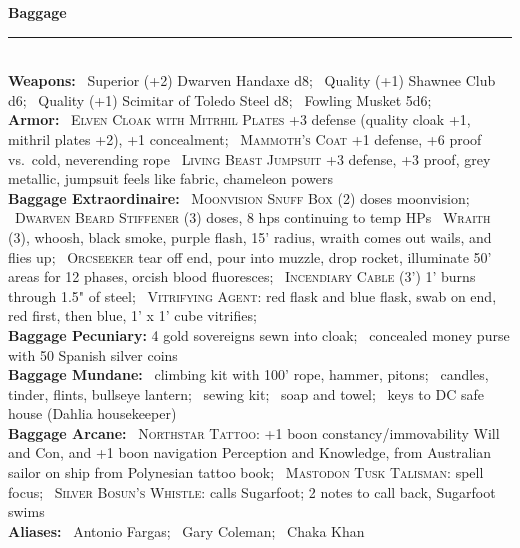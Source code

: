 \documentclass[11pt]{article}
\newcommand{\heading}[1]{{\sc\bfseries #1}}
\begin{document}
\clearpage
\noindent
{\sc\bfseries\Large Baggage}
\vspace*{4pt}
\hrule
\mbox{ }
\\[4pt]
\heading{Weapons:}
\ Superior (+2) Dwarven Handaxe d8;
\ Quality (+1) Shawnee Club d6;
\ Quality (+1) Scimitar of Toledo Steel d8;
\ Fowling Musket 5d6;
%
\\[6pt]
%
\heading{Armor:}
\ \textsc{Elven Cloak with Mitrhil Plates} +3 defense (quality cloak
+1, mithril plates +2), +1 concealment;
\ \textsc{Mammoth's Coat} +1 defense, +6 proof vs.\ cold, neverending rope
\ \textsc{Living Beast Jumpsuit} +3 defense, +3 proof, grey metallic,
jumpsuit feels like fabric, chameleon powers
%
\\[6pt]
%
\heading{Baggage Extraordinaire:}
\ \textsc{Moonvision Snuff Box} (2) doses moonvision;
\ \textsc{Dwarven Beard Stiffener} (3) doses, 8 hps continuing to temp
HPs
\ \textsc{Wraith} (3), whoosh, black smoke, purple flash, 15' radius,
wraith comes out wails, and flies up;
\ \textsc{Orcseeker} tear off end, pour into muzzle, drop rocket,
illuminate 50' areas for 12 phases, orcish blood fluoresces;
\ \textsc{Incendiary Cable} (3') 1' burns through 1.5" of steel;
\ \textsc{Vitrifying Agent}: red flask and blue flask, swab on end,
red first, then blue, 1' x 1' cube vitrifies;
%
\\[6pt]
%
\heading{Baggage Pecuniary:}
4 gold sovereigns sewn into cloak;
\ concealed money purse with 50 Spanish silver coins
%
\\[6pt]
%
\heading{Baggage Mundane:}
\ climbing kit with 100' rope, hammer, pitons;
\ candles, tinder, flints, bullseye lantern;
\ sewing kit;
\ soap and towel;
\ keys to DC safe house (Dahlia housekeeper)
%
\\[6pt]
%
\heading{Baggage Arcane:}
\ \textsc{Northstar Tattoo:} +1 boon constancy/immovability Will and Con,
and +1 boon navigation Perception and Knowledge,
from Australian sailor on ship from Polynesian tattoo book;
\ \textsc{Mastodon Tusk Talisman:} spell focus;
\ \textsc{Silver Bosun's Whistle:} calls Sugarfoot; 2 notes to call
back, Sugarfoot swims
%
\\[6pt]
\heading{Aliases:} \ Antonio Fargas; \ Gary Coleman; \ Chaka Khan
%
\end{document}
